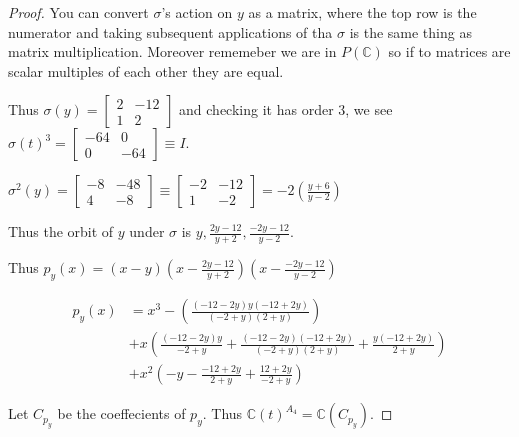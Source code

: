 \documentclass{article}
\newcommand{\C}{\mathbb{C}}
\begin{document}
\begin{proof}
    You can convert $\sigma$'s action on $y$ as a matrix, where the top row is the numerator and taking subsequent applications of tha $\sigma$ is the same thing as matrix multiplication. Moreover rememeber we are in $P(\C)$ so if to matrices are scalar multiples of each other they are equal. 
    
    Thus $\sigma(y) = \begin{bmatrix}
        2 & -12 \\ 1 & 2
    \end{bmatrix}$ and checking it has order 3, we see $\sigma(t)^3 = \begin{bmatrix}
        -64 & 0 \\ 0 & -64
    \end{bmatrix} \equiv I$.
    
    $\sigma^2(y) = \begin{bmatrix}
        -8 & -48 \\ 4 & -8
    \end{bmatrix} \equiv \begin{bmatrix}
        -2 & -12 \\ 1 & -2
    \end{bmatrix} = -2(\frac{y + 6}{y - 2})$ 
    
    Thus the orbit of $y$ under $\sigma$ is $y, \frac{2y - 12}{y + 2}, \frac{-2y - 12}{y - 2}$.
    
    Thus $p_y(x) = (x - y)(x - \frac{2y - 12}{y + 2})(x - \frac{-2y - 12}{y - 2})$
    
    \begin{align*}
        p_y(x) &= x^3 - \left(\frac{(-12 - 2y)y(-12 + 2y)}{(-2 + y)(2 + y)}\right) \\
        &+ x \left(\frac{(-12 - 2y)y}{-2 + y} + \frac{(-12 - 2y)(-12 + 2y)}{(-2 + y)(2 + y)} + \frac{y(-12 + 2y)}{2 + y}\right) \\
        &+ x^2 \left(-y - \frac{-12 + 2y}{2 + y} + \frac{12 + 2y}{-2 + y}\right)
    \end{align*}

    Let $C_{p_y}$ be the coeffecients of $p_y$. Thus $\C(t)^{A_4} = \C(C_{p_y})$.   

\end{proof}

\bigskip
\end{document}
